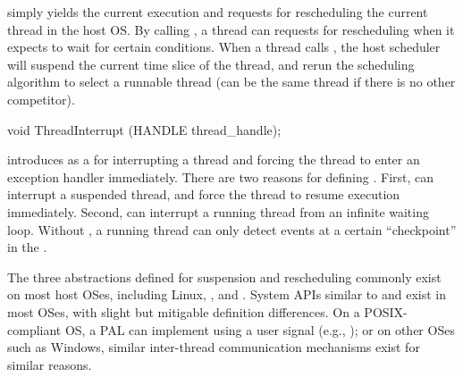  simply yields the current execution and requests for rescheduling the current thread in the host OS.
By calling , a thread can requests for rescheduling when it expects
to wait for certain conditions.
When a thread calls , the host scheduler will suspend the current time slice of the thread,
and rerun the scheduling algorithm
to select a runnable thread (can be the same thread if there is no other competitor).



\begin{paldef}
void ThreadInterrupt (HANDLE thread_handle);
\end{paldef}



\graphene{} introduces
 as a \hostapi{} for interrupting a thread and forcing the thread to enter an exception handler immediately.
There are two reasons for defining .
First,  can interrupt a suspended thread, and force the thread to resume execution immediately.
Second,  can interrupt a running thread from an infinite waiting loop.
Without ,
a running thread can only detect events at a certain ``checkpoint'' in the \libos{}.


The three abstractions defined for suspension and rescheduling
commonly exist on most host OSes, including Linux, \win{}, and \osx{}.
System APIs similar to
 and 
exist in most OSes,
with slight but mitigable definition differences.
On a POSIX-compliant OS, a PAL can implement  using a user signal (e.g., ); or on other OSes such as Windows, similar inter-thread communication mechanisms exist for similar reasons. 




